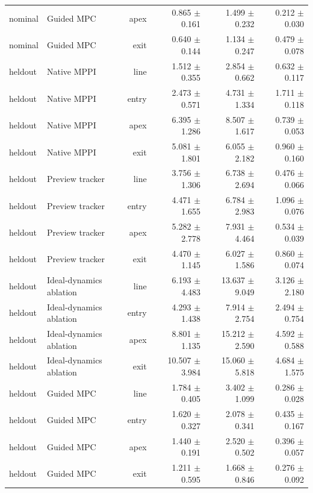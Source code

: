 \begin{table}[t]
{\begin{tabular}{llrrrr}
nominal & Guided MPC & apex & 0.865 $\pm$ 0.161 & 1.499 $\pm$ 0.232 & 0.212 $\pm$ 0.030 \\
nominal & Guided MPC & exit & 0.640 $\pm$ 0.144 & 1.134 $\pm$ 0.247 & 0.479 $\pm$ 0.078 \\
heldout & Native MPPI & line & 1.512 $\pm$ 0.355 & 2.854 $\pm$ 0.662 & 0.632 $\pm$ 0.117 \\
heldout & Native MPPI & entry & 2.473 $\pm$ 0.571 & 4.731 $\pm$ 1.334 & 1.711 $\pm$ 0.118 \\
heldout & Native MPPI & apex & 6.395 $\pm$ 1.286 & 8.507 $\pm$ 1.617 & 0.739 $\pm$ 0.053 \\
heldout & Native MPPI & exit & 5.081 $\pm$ 1.801 & 6.055 $\pm$ 2.182 & 0.960 $\pm$ 0.160 \\
heldout & Preview tracker & line & 3.756 $\pm$ 1.306 & 6.738 $\pm$ 2.694 & 0.476 $\pm$ 0.066 \\
heldout & Preview tracker & entry & 4.471 $\pm$ 1.655 & 6.784 $\pm$ 2.983 & 1.096 $\pm$ 0.076 \\
heldout & Preview tracker & apex & 5.282 $\pm$ 2.778 & 7.931 $\pm$ 4.464 & 0.534 $\pm$ 0.039 \\
heldout & Preview tracker & exit & 4.470 $\pm$ 1.145 & 6.027 $\pm$ 1.586 & 0.860 $\pm$ 0.074 \\
heldout & Ideal-dynamics ablation & line & 6.193 $\pm$ 4.483 & 13.637 $\pm$ 9.049 & 3.126 $\pm$ 2.180 \\
heldout & Ideal-dynamics ablation & entry & 4.293 $\pm$ 1.438 & 7.914 $\pm$ 2.754 & 2.494 $\pm$ 0.754 \\
heldout & Ideal-dynamics ablation & apex & 8.801 $\pm$ 1.135 & 15.212 $\pm$ 2.590 & 4.592 $\pm$ 0.588 \\
heldout & Ideal-dynamics ablation & exit & 10.507 $\pm$ 3.984 & 15.060 $\pm$ 5.818 & 4.684 $\pm$ 1.575 \\
heldout & Guided MPC & line & 1.784 $\pm$ 0.405 & 3.402 $\pm$ 1.099 & 0.286 $\pm$ 0.028 \\
heldout & Guided MPC & entry & 1.620 $\pm$ 0.327 & 2.078 $\pm$ 0.341 & 0.435 $\pm$ 0.167 \\
heldout & Guided MPC & apex & 1.440 $\pm$ 0.191 & 2.520 $\pm$ 0.502 & 0.396 $\pm$ 0.057 \\
heldout & Guided MPC & exit & 1.211 $\pm$ 0.595 & 1.668 $\pm$ 0.846 & 0.276 $\pm$ 0.092 \\
\bottomrule
\end{tabular}}
\end{table}
